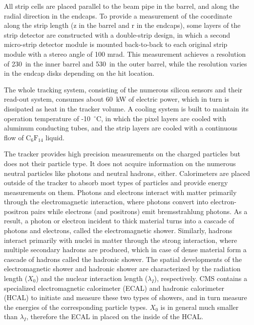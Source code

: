 All strip cells are placed parallel to the beam pipe in the barrel, and along the radial direction in the endcaps.
To provide a measurement of the coordinate along the strip length (z in the barrel and r in the endcaps),
some layers of the strip detector are constructed with a double-strip design, 
in which a second micro-strip detector module is mounted back-to-back to each original strip module with a stereo angle of 100 mrad. 
This measurement achieves a resolution of 230~\mum in the inner barrel and 530~\mum in the outer barrel, 
while the resolution varies in the endcap disks depending on the hit location.

The whole tracking system, consisting of the numerous silicon sensors and their read-out system,
consumes about 60~kW of electric power, which in turn is dissipated as heat in the tracker volume.
A cooling system is built to maintain its operation temperature of -10~${}^{\circ}$C, 
in which the pixel layers are cooled with aluminum conducting tubes, 
and the strip layers are cooled with a continuous flow of $\text{C}_{6}\text{F}_{14}$ liquid.


The tracker provides high precision measurements on the charged particles but does not their particle type.
It does not acquire information on the numerous neutral particles like photons and neutral hadrons, either.
Calorimeters are placed outside of the tracker to absorb most types of particles and provide energy measurements on them.
Photons and electrons interact with matter primarily through the electromagnetic interaction, 
where photons convert into electron-positron pairs while electrons (and positrons) emit bremsstrahlung photons.
As a result, a photon or electron incident to thick material turns into a cascade of photons and electrons, called the electromagnetic shower.
Similarly, hadrons interact primarily with nuclei in matter through the strong interaction,
where multiple secondary hadrons are produced, which in case of dense material form a cascade of hadrons called the hadronic shower.
The spatial developments of the electromagnetic shower and hadronic shower are characterized by the radiation length ($X_{0}$) and the nuclear interaction length ($\lambda_{I}$), respectively.
CMS contains a specialized electromagnetic calorimeter (ECAL) and hadronic calorimeter (HCAL) to initiate and measure these two types of showers,
and in turn measure the energies of the corresponding particle types.
$X_{0}$ is in general much smaller than $\lambda_{I}$, therefore the ECAL in placed on the inside of the HCAL.


